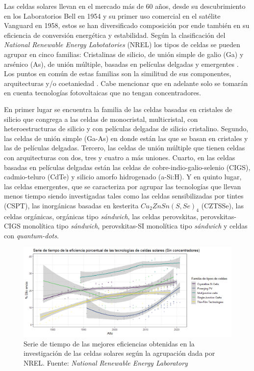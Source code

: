 Las celdas solares llevan en el mercado más de 60 años, desde su descubrimiento en los  Laboratorios Bell en 1954 \cite{green2009path} y su primer uso comercial en el satélite Vanguard \cite{singh2013solar} en 1958, estos se han diversificado composición por ende también en su eficiencia de conversión energética y estabilidad. Según la clasificación del \textit{National Renewable Energy Labotatories} (NREL) los tipos de celdas se pueden agrupar en cinco familias: Cristalinas de silicio, de unión simple de galio (Ga) y arsénico (As), de unión múltiple, basadas en películas delgadas y emergentes \cite{nrel}. Los puntos en común de estas familias son la similitud de sus componentes, arquitecturas y/o coetaniedad \cite{blakers2013}. Cabe mencionar que en adelante solo se tomarán en cuenta tecnologías fotovoltaicas que no tengan concentradores.


En primer lugar se encuentra la familia de las celdas basadas en cristales de silicio que congrega a las celdas de monocristal, multicristal, con heteroestructuras de silicio y con películas delgadas de silicio cristalino. Segundo, las celdas de unión simple (Ga-As) en donde están las que se basan en cristales y las de películas delgadas. Tercero, las celdas de unión múltiple que tienen celdas con arquitecturas con dos, tres y cuatro a más uniones. Cuarto, en las celdas basadas en películas delgadas están las celdas de cobre-indio-galio-selenio (CIGS), cadmio-teluro (CdTe) y silicio amorfo hidrogenado (a-Si:H). Y en quinto lugar, las celdas emergentes, que se caracteriza por agrupar las tecnologías que llevan menos tiempo siendo investigadas tales como las celdas sensibilizadas por tintes (CSPT), las inorgánicas basadas en kesterita $Cu_2ZnSn(S,Se)_4$ (CZTSSe), las celdas orgánicas, orgánicas tipo \textit{sándwich}, las celdas perovskitas, perovskitas-CIGS monolítica tipo \textit{sándwich}, perovskitas-SI monolítica tipo \textit{sándwich} y celdas con \textit{quantum-dots}. 

\begin{figure}[h!]
    \includegraphics[scale=0.55]{img/SerieTiempo.png}
    \caption{Serie de tiempo de las mejores eficiencias obtenidas en la investigación de las celdas solares según la agrupación dada por NREL.
    Fuente: \textit{National Renewable Energy Laboratory} \cite{nrel}}
    \label{img:SerieTiempo}
\end{figure}

